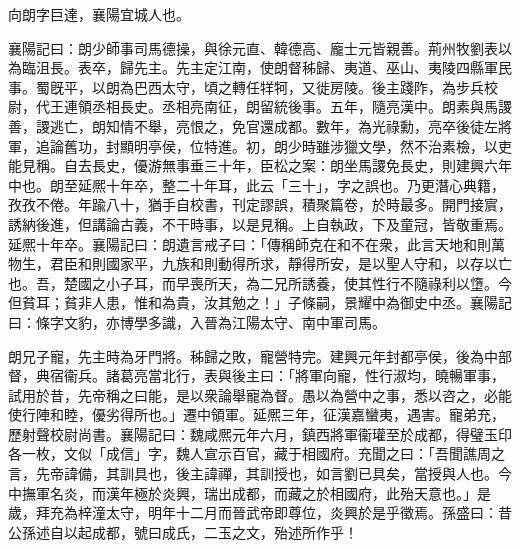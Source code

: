 
\begin{pinyinscope}
向朗字巨達，襄陽宜城人也。

襄陽記曰：朗少師事司馬德操，與徐元直、韓德高、龐士元皆親善。荊州牧劉表以為臨沮長。表卒，歸先主。先主定江南，使朗督秭歸、夷道、巫山、夷陵四縣軍民事。蜀旣平，以朗為巴西太守，頃之轉任䍧牱，又徙房陵。後主踐阼，為步兵校尉，代王連領丞相長史。丞相亮南征，朗留統後事。五年，隨亮漢中。朗素與馬謖善，謖逃亡，朗知情不舉，亮恨之，免官還成都。數年，為光祿勳，亮卒後徒左將軍，追論舊功，封顯明亭侯，位特進。初，朗少時雖涉獵文學，然不治素檢，以吏能見稱。自去長史，優游無事垂三十年，臣松之案：朗坐馬謖免長史，則建興六年中也。朗至延熈十年卒，整二十年耳，此云「三十」，字之誤也。乃更潛心典籍，孜孜不倦。年踰八十，猶手自校書，刊定謬誤，積聚篇卷，於時最多。開門接賔，誘納後進，但講論古義，不干時事，以是見稱。上自執政，下及童冠，皆敬重焉。延熈十年卒。襄陽記曰：朗遺言戒子曰：「傳稱師克在和不在衆，此言天地和則萬物生，君臣和則國家平，九族和則動得所求，靜得所安，是以聖人守和，以存以亡也。吾，楚國之小子耳，而早喪所天，為二兄所誘養，使其性行不隨祿利以墯。今但貧耳；貧非人患，惟和為貴，汝其勉之！」子條嗣，景耀中為御史中丞。襄陽記曰：條字文豹，亦博學多識，入晉為江陽太守、南中軍司馬。

朗兄子寵，先主時為牙門將。秭歸之敗，寵營特完。建興元年封都亭侯，後為中部督，典宿衞兵。諸葛亮當北行，表與後主曰：「將軍向寵，性行淑均，曉暢軍事，試用於昔，先帝稱之曰能，是以衆論舉寵為督。愚以為營中之事，悉以咨之，必能使行陣和睦，優劣得所也。」遷中領軍。延熈三年，征漢嘉蠻夷，遇害。寵弟充，歷射聲校尉尚書。襄陽記曰：魏咸熈元年六月，鎮西將軍衞瓘至於成都，得璧玉印各一枚，文似「成信」字，魏人宣示百官，藏于相國府。充聞之曰：「吾聞譙周之言，先帝諱備，其訓具也，後主諱禪，其訓授也，如言劉已具矣，當授與人也。今中撫軍名炎，而漢年極於炎興，瑞出成都，而藏之於相國府，此殆天意也。」是歲，拜充為梓潼太守，明年十二月而晉武帝即尊位，炎興於是乎徵焉。孫盛曰：昔公孫述自以起成都，號曰成氏，二玉之文，殆述所作乎！


\end{pinyinscope}